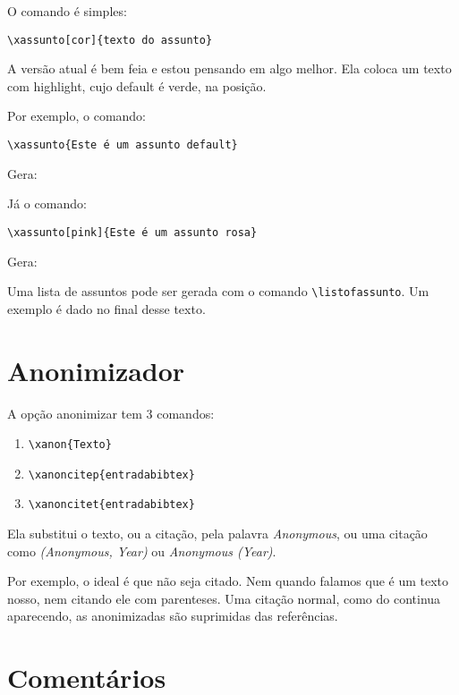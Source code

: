 \documentclass{article}
\begin{document}
O comando é simples:

\begin{verbatim}
\xassunto[cor]{texto do assunto}
\end{verbatim}

A versão atual é bem feia e estou pensando em algo melhor. Ela coloca um texto com highlight, cujo default é verde, na posição.

Por exemplo, o comando:
\begin{verbatim}
\xassunto{Este é um assunto default}    
\end{verbatim}

Gera:


Já o comando:
\begin{verbatim}
\xassunto[pink]{Este é um assunto rosa}   
\end{verbatim}

Gera:


Uma lista de assuntos pode ser gerada com o comando
\verb!\listofassunto!. Um exemplo é dado no final desse texto.

\section{Anonimizador}

A opção anonimizar tem 3 comandos:
\begin{enumerate}
    \item \verb!\xanon{Texto}!
    \item \verb!\xanoncitep{entradabibtex}!
    \item \verb!\xanoncitet{entradabibtex}!
\end{enumerate}

Ela substitui o texto, ou a citação, pela palavra \textit{Anonymous}, ou uma citação como \textit{(Anonymous, Year)} ou \textit{Anonymous (Year)}.

Por exemplo, o ideal é que  não seja citado. Nem quando falamos que  é um texto nosso, nem citando ele com parenteses. Uma citação normal, como do \citet{Juran2010} continua aparecendo, as anonimizadas são suprimidas das referências.

\section{Comentários}
\end{document}
